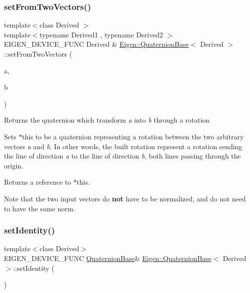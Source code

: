 \subsubsection{\texorpdfstring{setFromTwoVectors()}{setFromTwoVectors()}}
{\footnotesize\ttfamily template$<$class Derived $>$ \\
template$<$typename Derived1 , typename Derived2 $>$ \\
E\+I\+G\+E\+N\+\_\+\+D\+E\+V\+I\+C\+E\+\_\+\+F\+U\+NC Derived \& \mbox{\hyperlink{class_eigen_1_1_quaternion_base}{Eigen\+::\+Quaternion\+Base}}$<$ Derived $>$\+::set\+From\+Two\+Vectors (\begin{DoxyParamCaption}\item[{const \mbox{\hyperlink{class_eigen_1_1_matrix_base}{Matrix\+Base}}$<$ Derived1 $>$ \&}]{a,  }\item[{const \mbox{\hyperlink{class_eigen_1_1_matrix_base}{Matrix\+Base}}$<$ Derived2 $>$ \&}]{b }\end{DoxyParamCaption})\hspace{0.3cm}{\ttfamily [inline]}}

\begin{DoxyReturn}{Returns}
the quaternion which transform {\itshape a} into {\itshape b} through a rotation
\end{DoxyReturn}
Sets {\ttfamily $\ast$this} to be a quaternion representing a rotation between the two arbitrary vectors {\itshape a} and {\itshape b}. In other words, the built rotation represent a rotation sending the line of direction {\itshape a} to the line of direction {\itshape b}, both lines passing through the origin.

\begin{DoxyReturn}{Returns}
a reference to {\ttfamily $\ast$this}.
\end{DoxyReturn}
Note that the two input vectors do {\bfseries{not}} have to be normalized, and do not need to have the same norm. \mbox{\label{class_eigen_1_1_quaternion_base_a113a5ffea680c7427dc1144d7c66efe9}} 
\subsubsection{\texorpdfstring{setIdentity()}{setIdentity()}}
{\footnotesize\ttfamily template$<$class Derived$>$ \\
E\+I\+G\+E\+N\+\_\+\+D\+E\+V\+I\+C\+E\+\_\+\+F\+U\+NC \mbox{\hyperlink{class_eigen_1_1_quaternion_base}{Quaternion\+Base}}\& \mbox{\hyperlink{class_eigen_1_1_quaternion_base}{Eigen\+::\+Quaternion\+Base}}$<$ Derived $>$\+::set\+Identity (\begin{DoxyParamCaption}{ }\end{DoxyParamCaption})\hspace{0.3cm}{\ttfamily [inline]}}

